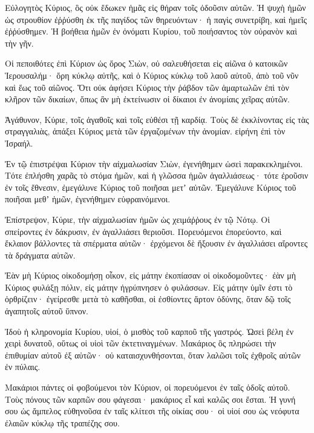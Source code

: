\begin{spacing}{1.1}
\begin{multicols}{2}
Εὐλογητὸς Κύριος, ὃς οὐκ ἔδωκεν ἡμᾶς εἰς θήραν τοῖς ὀδοῦσιν αὐτῶν.
Ἡ ψυχὴ ἡμῶν ὡς στρουθίον ἐῤῥύσθη ἐκ τῆς παγίδος τῶν θηρευόντων· ἡ παγὶς συνετρίβη, καὶ ἡμεῖς ἐῤῥύσθημεν.
Ἡ βοήθεια ἡμῶν ἐν ὀνόματι Κυρίου, τοῦ ποιήσαντος τὸν οὐρανὸν καὶ τὴν γῆν.

Οἱ πεποιθότες ἐπὶ Κύριον ὡς ὄρος Σιὼν, οὐ σαλευθήσεται εἰς αἰῶνα ὁ κατοικῶν Ἱερουσαλήμ·
ὄρη κύκλῳ αὐτῆς, καὶ ὁ Κύριος κύκλῳ τοῦ λαοῦ αὐτοῦ, ἀπὸ τοῦ νῦν καὶ ἕως τοῦ αἰῶνος.
Ὅτι οὐκ ἀφήσει Κύριος τὴν ῥάβδον τῶν ἁμαρτωλῶν ἐπὶ τὸν κλῆρον τῶν δικαίων, ὅπως ἂν μὴ ἐκτείνωσιν οἱ δίκαιοι ἐν ἀνομίαις χεῖρας αὐτῶν.

Ἀγάθυνον, Κύριε, τοῖς ἀγαθοῖς καὶ τοῖς εὐθέσι τῇ καρδίᾳ.
Τοὺς δὲ ἐκκλίνοντας εἰς τὰς στραγγαλιὰς, ἀπάξει Κύριος μετὰ τῶν ἐργαζομένων τὴν ἀνομίαν. εἰρήνη ἐπὶ τὸν Ἰσραήλ.

Ἐν τῷ ἐπιστρέψαι Κύριον τὴν αἰχμαλωσίαν Σιὼν, ἐγενήθημεν ὡσεὶ παρακεκλημένοι.
Τότε ἐπλήσθη χαρᾶς τὸ στόμα ἡμῶν, καὶ ἡ γλῶσσα ἡμῶν ἀγαλλιάσεως· τότε ἐροῦσιν ἐν τοῖς ἔθνεσιν, ἐμεγάλυνε Κύριος τοῦ ποιῆσαι μετʼ αὐτῶν.
Ἐμεγάλυνε Κύριος τοῦ ποιῆσαι μεθʼ ἡμῶν, ἐγενήθημεν εὐφραινόμενοι.

Ἐπίστρεψον, Κύριε, τὴν αἰχμαλωσίαν ἡμῶν ὡς χειμάῤῥους ἐν τῷ Νότῳ.
Οἱ σπείροντες ἐν δάκρυσιν, ἐν ἀγαλλιάσει θεριοῦσι.
Πορευόμενοι ἐπορεύοντο, καὶ ἔκλαιον βάλλοντες τὰ σπέρματα αὐτῶν· ἐρχόμενοι δὲ ἥξουσιν ἐν ἀγαλλιάσει αἴροντες τὰ δράγματα αὐτῶν.

Ἐὰν μὴ Κύριος οἰκοδομήσῃ οἶκον, εἰς μάτην ἐκοπίασαν οἱ οἰκοδομοῦντες· ἐὰν μὴ Κύριος φυλάξῃ πόλιν, εἰς μάτην ἠγρύπνησεν ὁ φυλάσσων.
Εἰς μάτην ὑμῖν ἐστι τὸ ὀρθρίζειν· ἐγείρεσθε μετὰ τὸ καθῆσθαι, οἱ ἐσθίοντες ἄρτον ὀδύνης, ὅταν δῷ τοῖς ἀγαπητοῖς αὐτοῦ ὕπνον.

Ἰδοὺ ἡ κληρονομία Κυρίου, υἱοί, ὁ μισθὸς τοῦ καρποῦ τῆς γαστρός.
Ὡσεὶ βέλη ἐν χειρὶ δυνατοῦ, οὕτως οἱ υἱοὶ τῶν ἐκτετιναγμένων.
Μακάριος ὃς πληρώσει τὴν ἐπιθυμίαν αὐτοῦ ἐξ αὐτῶν· οὐ καταισχυνθήσονται, ὅταν λαλῶσι τοῖς ἐχθροῖς αὐτῶν ἐν πύλαις.

Μακάριοι πάντες οἱ φοβούμενοι τὸν Κύριον, οἱ πορευόμενοι ἐν ταῖς ὁδοῖς αὐτοῦ.
Τοὺς πόνους τῶν καρπῶν σου φάγεσαι· μακάριος εἶ καὶ καλῶς σοι ἔσται.
Ἡ γυνή σου ὡς ἄμπελος εὐθηνοῦσα ἐν ταῖς κλίτεσι τῆς οἰκίας σου· οἱ υἱοί σου ὡς νεόφυτα ἐλαιῶν κύκλῳ τῆς τραπέζης σου.


\end{multicols}
\end{spacing}
